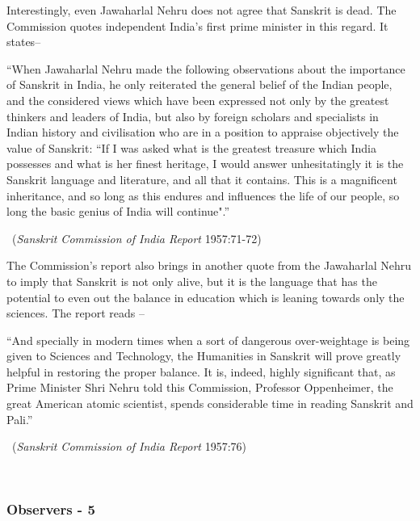 Interestingly, even Jawaharlal Nehru does not agree that Sanskrit is dead. The Commission quotes independent India’s first prime minister in this regard. It states–
\begin{myquote}
\eleven
“When Jawaharlal Nehru made the following observations about the importance of Sanskrit in India, he only reiterated the general belief of the Indian people, and the considered views which have been expressed not only by the greatest thinkers and leaders of India, but also by foreign scholars and specialists in Indian history and civilisation who are in a position to appraise objectively the value of Sanskrit: ``If I was asked what is the greatest treasure which India possesses and what is her finest heritage, I would answer unhesitatingly it is the Sanskrit language and literature, and all that it contains. This is a magnificent inheritance, and so long as this endures and influences the life of our people, so long the basic genius of India will continue".” 
\vskip -5pt

~\hfill({\sl Sanskrit Commission of India Report} 1957:71-72)
\end{myquote}

The Commission’s report also brings in another quote from the Jawaharlal Nehru to imply that Sanskrit is not only alive, but it is the language that has the potential to even out the balance in education which is leaning towards only the sciences. The report reads  – 
\begin{myquote}
\eleven
“And specially in modern times when a sort of dangerous over-weightage is being given to Sciences and Technology, the Humanities in Sanskrit will prove greatly helpful in restoring the proper balance. It is, indeed, highly significant that, as Prime Minister Shri Nehru told this Commission, Professor Oppenheimer, the great American atomic scientist, spends considerable time in reading Sanskrit and Pali.” 
\vskip -5pt

~\hfill({\sl Sanskrit Commission of India Report} 1957:76)
\end{myquote}

~\\[-45pt]

\subsubsection{Observers - 5}
\vskip -3pt

